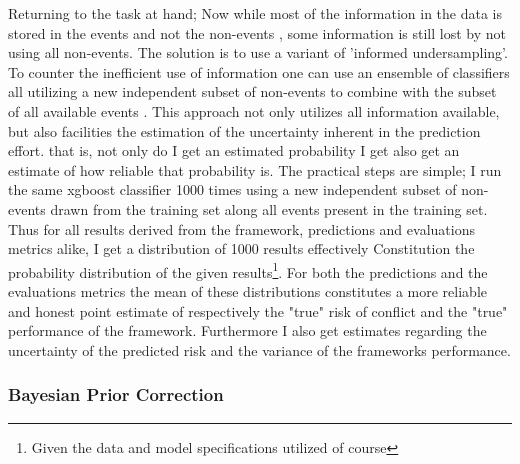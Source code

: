 \documentclass[a4paper]{article}
\begin{document}
Returning to the task at hand; Now while most of the information in the data is stored in the events and not the non-events \cite[139]{King_Zeng_2001}, some information is still lost by not using all non-events. The solution is to use a variant of 'informed undersampling'. To counter the inefficient use of information one can use an ensemble of classifiers all utilizing a new independent subset of non-events to combine with the subset of all available events \cite[1267]{He_2008}. This approach not only utilizes all information available, but also facilities the estimation of the uncertainty inherent in the prediction effort. that is, not only do I get an estimated probability I get also get an estimate of how reliable that probability is. The practical steps are simple; I run the same xgboost classifier 1000 times using a new independent subset of non-events drawn from the training set along all events present in the training set. Thus for all results derived from the framework,  predictions and evaluations metrics alike, I get a distribution of 1000 results effectively Constitution the probability distribution of the given results\footnote{Given the data and model specifications utilized of course}. For both the predictions and the evaluations metrics the mean of these distributions constitutes a more reliable and honest point estimate of respectively the "true" risk of conflict and the "true" performance of the framework. Furthermore I also get estimates regarding the uncertainty of the predicted risk and the variance of the frameworks performance.\par

\subsubsection{Bayesian Prior Correction}
\end{document}
